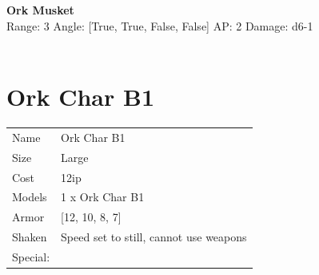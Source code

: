 \ \\

\ \\
{\bf Ork Musket } \\



Range: 3  Angle: [True, True, False, False] AP: 2 Damage: d6-1 \\




 
\ \\













\clearpage

\section{ Ork Char B1 }

\begin{tabular}{ll}
  Name & Ork Char B1 \\
  Size & Large\\
  Cost & 12ip\\
  Models & 1 x Ork Char B1\\
  Armor & [12, 10, 8, 7]\\
  Shaken & Speed set to still, cannot use weapons\\
  Special: \\
\end{tabular}

\noindent 

